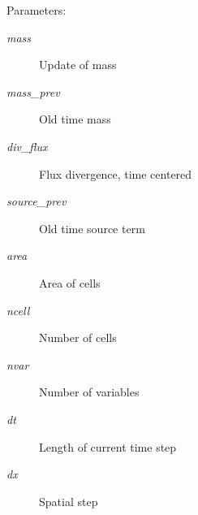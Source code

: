 \begin{Desc}
\item[Parameters:]
\begin{description}
\item[{\em mass}]Update of mass\item[{\em mass\_\-prev}]Old time mass\item[{\em div\_\-flux}]Flux divergence, time centered\item[{\em source\_\-prev}]Old time source term\item[{\em area}]Area of cells\item[{\em ncell}]Number of cells\item[{\em nvar}]Number of variables\item[{\em dt}]Length of current time step\item[{\em dx}]Spatial step \end{description}
\end{Desc}
